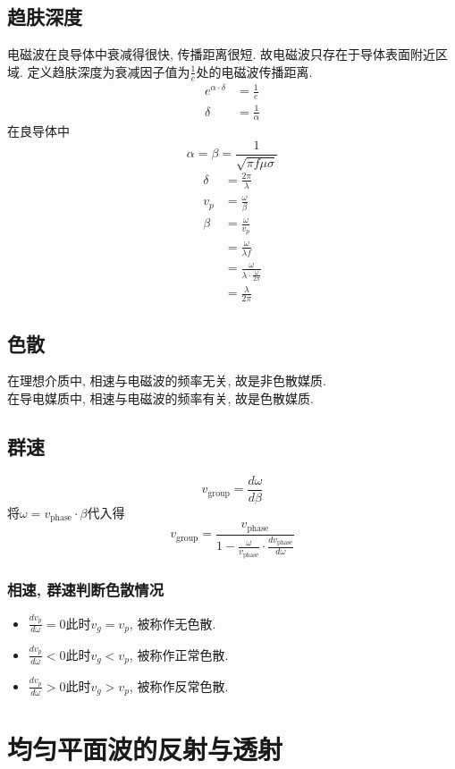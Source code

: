 \documentclass[a4paper]{report}
\begin{document}
\section{趋肤深度}
电磁波在良导体中衰减得很快, 传播距离很短. 故电磁波只存在于导体表面附近区域. 
定义趋肤深度为衰减因子值为$\frac{1}{e}$处的电磁波传播距离. 
\begin{align*}
    e^{\alpha\cdot\delta}&=\frac{1}{e}\\
    \delta&=\frac{1}{\alpha}
\end{align*}
在良导体中$$\alpha=\beta=\frac{1}{\sqrt{\pi f\mu\sigma}}$$
\begin{align*}
    \delta&=\frac{2\pi}{\lambda}\\
    v_p&=\frac{\omega}{\beta}\\
    \beta&=\frac{\omega}{v_p}\\
    &=\frac{\omega}{\lambda f}\\
    &=\frac{\omega}{\lambda\cdot\frac{\omega}{2\pi}}\\
    &=\frac{\lambda}{2\pi}
\end{align*}
\section{色散}
在理想介质中, 相速与电磁波的频率无关, 故是非色散媒质. \\ 
在导电媒质中, 相速与电磁波的频率有关, 故是色散媒质.  
\section{群速}
$$v_{\text{group}}=\frac{d \omega }{d \beta}$$
将$\omega=v_{\text{phase}}\cdot\beta$代入得
$$v_{\text{group}}=\frac{v_{\text{phase}}}{1-\frac{\omega}{v_{\text{phase}}}\cdot \frac{d v_{\text{phase}} }{d \omega}}$$
\subsection{相速, 群速判断色散情况}
\begin{itemize}
    \item $\frac{d v_p }{d \omega}=0$此时$v_g=v_p$, 被称作无色散. 
    \item $\frac{d v_p }{d \omega}<0$此时$v_g<v_p$, 被称作正常色散. 
    \item $\frac{d v_p }{d \omega}>0$此时$v_g>v_p$, 被称作反常色散. 
\end{itemize}
\chapter{均匀平面波的反射与透射}
\end{document}
